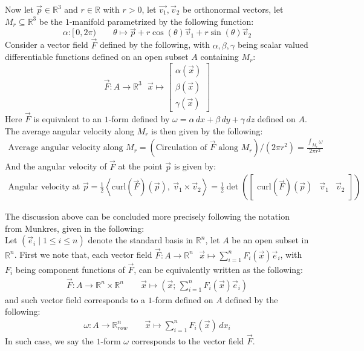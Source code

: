 \documentclass[11pt,oneside]{book}
\theoremstyle{break}
\theoremstyle{break}
\newcommand{\R}{\mathbb{R}}
\newcommand{\bmat}[1]{\begin{bmatrix} #1 \end{bmatrix}}
\begin{document}
Now let $\vec{p} \in \R^3$ and $r \in \R$ with $r>0$, let $\vec{v_1},\vec{v}_2$ be orthonormal vectors, let $M_r \subseteq \R^3$ be the $1$-manifold parametrized by the following function:
$$\alpha:[\,0, 2\pi)\qquad \theta \mapsto \vec{p} + r\cos(\theta) \vec{v}_1 + r\sin(\theta) \vec{v}_2$$ 
Consider a vector field $\vec{F}$ defined by the following, with $\alpha,\beta, \gamma$ being scalar valued differentiable functions defined on an open subset $A$ containing $M_r$:
$$\vec{F}:A \to \R^3 \ \ \ \vec{x}\mapsto \bmat{\alpha(\vec{x})\\ \beta(\vec{x}) \\ \gamma(\vec{x})}$$
Here $\vec{F}$ is equivalent to an $1$-form defined by $\omega = \alpha\, dx + \beta\, dy + \gamma \, dz$ defined on $A$. \\
The average angular velocity along $M_r$ is then given by the following:
\begin{align*}
\text{Average angular velocity along }M_r = \left(\text{Circulation of }\vec{F}\text{ along }M_r\right)/(2\pi r^2) = \frac{\int_{M_r} \omega}{2\pi r^2} 
\end{align*}
And the angular velocity of $\vec{F}$ at the point $\vec{p}$ is given by:
\begin{align*}
\text{Angular velocity at }\vec{p} =  \frac{1}{2}\left< \text{curl}(\vec{F})(\vec{p}), \ \vec{v}_1\times \vec{v}_2 \right> = \frac{1}{2}\det\left( \bmat{ \text{curl}(\vec{F})(\vec{p})& \vec{v}_1&  \vec{v}_2 }\right)
\end{align*}

The discussion above can be concluded more precisely following the notation from Munkres, given in the following:\\

Let $(\vec{e}_i\mid 1\leq i\leq n)$ denote the standard basis in $\R^n$, let $A$ be an open subset in $\R^n$. First we note that, each vector field $\vec{F}:A \to \R^n \ \ \ \vec{x}\mapsto \sum_{i=1}^n F_i (\vec{x}) \vec{e}_i$, with $F_i$ being component functions of $\vec{F}$, can be equivalently written as the following:
\begin{align*}
\vec{F}:A \to \R^n \times \R^n \qquad\vec{x}\mapsto \left(\vec{x};\, \sum_{i=1}^n F_i (\vec{x}) \vec{e}_i\right)
\end{align*}
and such vector field corresponds to a $1$-form defined on $A$ defined by the following:
\begin{align*}
\omega :A \to \R^n_{row}\qquad \vec{x}\mapsto \sum_{i=1}^n F_i(\vec{x}) \, dx_i
\end{align*}
In such case, we say the $1$-form $\omega$ corresponds to the vector field $\vec{F}$. 
\end{document}
